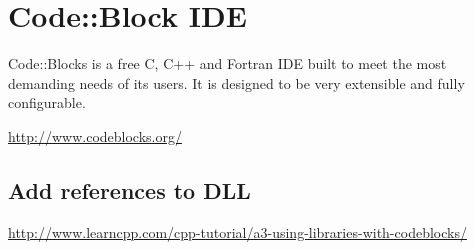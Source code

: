 \chapter{Code::Block IDE}
\label{chap:Code::Block}

Code::Blocks is a free C, C++ and Fortran IDE built to meet the most demanding
needs of its users. It is designed to be very extensible and fully configurable.


\url{http://www.codeblocks.org/}


\section{Add references to DLL}
\label{sec:using_LIB_Code::Block}

\url{http://www.learncpp.com/cpp-tutorial/a3-using-libraries-with-codeblocks/}